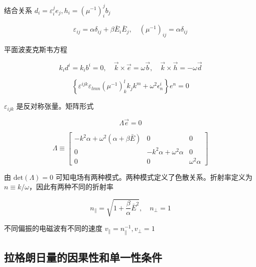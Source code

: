\documentclass[9pt, dvipsnames]{beamer} %
\begin{document}
\begin{frame}    
    结合关系 $d_i=\varepsilon_i^j e_j,h_i=\left(\mu^{-1} \right)_i^j b_j $
    
    $$
    \varepsilon_{ij} = \alpha\delta_{ij} + \beta\bar{E}_i\bar{E}_j ,\quad
    \left(\mu^{-1} \right)_{ij} = \alpha\delta_{ij} 
    $$
    
    平面波麦克斯韦方程
    
    $$
    k_i d^i = k_i b^i = 0,\quad
    \vec{k}\times\vec{e} = \omega\vec{b},\quad
    \vec{k}\times\vec{h} = -\omega\vec{d} 
    $$
    
    
    $$
    \left\{\varepsilon^{ijk}\varepsilon_{lmn} \left(\mu^{-1} \right)_k^l k_j k^m+\omega^2\epsilon_n^i \right\}e^n = 0
    $$
    
    $\varepsilon_{ijk} $ 是反对称张量。矩阵形式
    
    $$
    \Lambda \vec{e} = 0 
    $$
    
    $$
    \Lambda
    \equiv \begin{bmatrix}
    -k^2 \alpha+\omega^2\left(\alpha+\beta\bar{E} \right) &0 &0 \\
    0 &-k^2\alpha+\omega^2\alpha &0 \\
    0 &0 &\omega^2\alpha
    \end{bmatrix} 
    $$
    
    由 $\mathrm{det}(\Lambda)=0 $ 可知电场有两种模式。两种模式定义了色散关系。折射率定义为 $n\equiv k/\omega $，因此有两种不同的折射率
    
    $$
    n_\parallel = \sqrt{1+\frac{\beta }{\alpha } \bar{E}^2},\quad
    n_\perp = 1 
    $$
    
    不同偏振的电磁波有不同的速度 $v_\parallel=n_\parallel^{-1},v_\perp=1 $
\end{frame}

\subsection{拉格朗日量的因果性和单一性条件}
\end{document}
